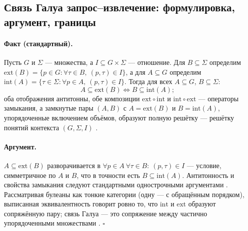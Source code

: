 \documentclass{article}
\begin{document}
\subsection{Связь Галуа запрос--извлечение: формулировка, аргумент, границы}
\label{app:galois}

\paragraph{Факт (стандартный).}
Пусть $G$ и $\Sigma$ --- множества, а $I \subseteq G \times \Sigma$ --- отношение. Для $B \subseteq \Sigma$ определим $\mathrm{ext}(B) = \{p \in G : \forall \tau \in B,\ (p,\tau) \in I\}$, а для $A \subseteq G$ определим $\mathrm{int}(A) = \{\tau \in \Sigma : \forall p \in A,\ (p,\tau) \in I\}$. Тогда для всех $A \subseteq G$, $B \subseteq \Sigma$:
\[
A \subseteq \mathrm{ext}(B) \iff B \subseteq \mathrm{int}(A);
\]
оба отображения антитонны, обе композиции $\mathrm{ext}\circ\mathrm{int}$ и $\mathrm{int}\circ\mathrm{ext}$ --- операторы замыкания, а замкнутые пары $(A, B)$ с $A = \mathrm{ext}(B)$ и $B = \mathrm{int}(A)$, упорядоченные включением объёмов, образуют полную решётку --- решётку понятий контекста $(G, \Sigma, I)$ \citep{ganter1999fca}.

\paragraph{Аргумент.}
$A \subseteq \mathrm{ext}(B)$ разворачивается в $\forall p \in A\ \forall \tau \in B:\ (p,\tau) \in I$ --- условие, симметричное по $A$ и $B$, что в точности есть $B \subseteq \mathrm{int}(A)$. Антитонность и свойства замыкания следуют стандартными однострочными аргументами \citep[Ch.~1]{ganter1999fca}. Рассматривая булеаны как тонкие категории (одну --- с обращённым порядком), выписанная эквивалентность говорит ровно то, что $\mathrm{int}$ и $\mathrm{ext}$ образуют сопряжённую пару; связь Галуа --- это сопряжение между частично упорядоченными множествами \citep[Ch.~IV]{maclane1998categories}. \hfill$\square$
\end{document}
